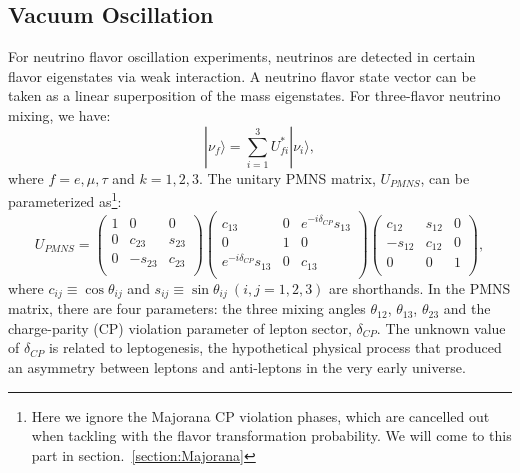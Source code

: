 \subsection{Vacuum Oscillation}\label{sectVacuumOsci}
For neutrino flavor oscillation experiments, neutrinos are detected in certain flavor eigenstates via weak interaction. A neutrino flavor state vector can be taken as a linear superposition of the mass eigenstates. For three-flavor neutrino mixing, we have\cite{pdg2018}:
\begin{equation}\label{eq:mixingmatrix}
|\nu_f\rangle = \sum_{i=1}^3U^*_{fi}|\nu_i\rangle, 
\end{equation}
where $f=e,\mu,\tau$ and $k=1,2,3$. The unitary PMNS matrix, $U_{PMNS}$, can be parameterized as\footnote{Here we ignore the Majorana CP violation phases, which are cancelled out when tackling with the flavor transformation probability. We will come to this part in section.~\ref{section:Majorana}}: 
\begin{equation}\label{eq:uPMNS}
U_{PMNS} =
\begin{pmatrix}
1 &0 &0\\
0 &c_{23} &s_{23}\\
0 &-s_{23} &c_{23}\\ 
\end{pmatrix}
\begin{pmatrix}
c_{13} &0 &e^{-i\delta_{CP}}s_{13}\\
0 &1 &0\\
e^{-i\delta_{CP}}s_{13} &0 &c_{13}\\ 
\end{pmatrix}
\begin{pmatrix}
c_{12} &s_{12} &0\\
-s_{12} &c_{12} &0\\
0 &0 &1\\ 
\end{pmatrix},
\end{equation}
where $c_{ij}\equiv \cos\theta_{ij}$ and $s_{ij}\equiv \sin\theta_{ij}~(i,j = 1,2,3)$ are shorthands.
In the PMNS matrix, there are four parameters: the three mixing angles $\theta_{12}$, $\theta_{13}$, $\theta_{23}$ and the charge-parity (CP) violation parameter of lepton sector, $\delta_{CP}$. The unknown value of $\delta_{CP}$ is related to leptogenesis, the hypothetical physical process that produced an asymmetry between leptons and anti-leptons in the very early universe\cite{wiki_cp}. 


